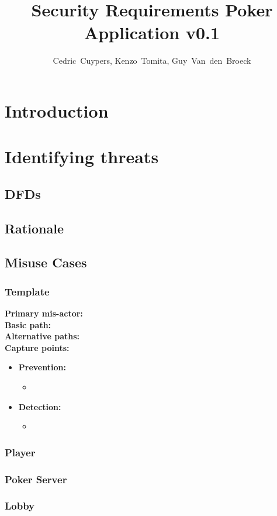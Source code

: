 \documentclass[a4paper,11pt]{report}
\author{Cedric~Cuypers, Kenzo~Tomita, Guy~Van~den~Broeck}
\title{Security Requirements Poker Application v0.1}
\begin{document}
 
\maketitle 
\tableofcontents 

\chapter{Introduction}
\chapter{Identifying threats}
\section{DFDs}
\section{Rationale}
\section{Misuse Cases}
\subsection{Template}
\textbf{Primary mis-actor:} \\
\textbf{Basic path:} \\
\textbf{Alternative paths:} \\
\textbf{Capture points:}
\begin{itemize}
\item \textbf{Prevention:}
\begin{itemize}
\item 
\end{itemize}
\item \textbf{Detection:}
\begin{itemize}
\item 
\end{itemize}
\end{itemize}

\subsection{Player}
\subsection{Poker Server}
\subsection{Lobby}
\end{document}
